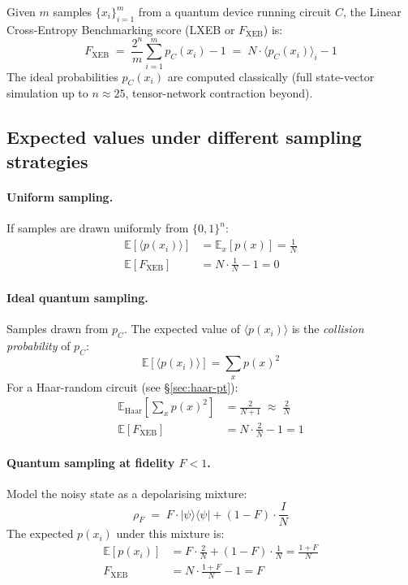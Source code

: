 \documentclass[11pt,a4paper]{article}
\theoremstyle{plain}
\theoremstyle{definition}
\theoremstyle{remark}
\newcommand{\E}{\mathbb{E}}
\begin{document}
Given $m$ samples $\{x_i\}_{i=1}^{m}$ from a quantum device running circuit $C$, the Linear Cross-Entropy Benchmarking score (LXEB or $F_{\mathrm{XEB}}$) is:
\begin{equation}
F_{\mathrm{XEB}} \;=\; \frac{2^n}{m} \sum_{i=1}^{m} p_C(x_i) - 1 \;=\; N \cdot \langle p_C(x_i) \rangle_i - 1
\label{eq:fxeb-def}
\end{equation}
The ideal probabilities $p_C(x_i)$ are computed classically (full state-vector simulation up to $n \approx 25$, tensor-network contraction beyond).

\subsection{Expected values under different sampling strategies}

\paragraph{Uniform sampling.} If samples are drawn uniformly from $\{0,1\}^n$:
\begin{align}
\E[\langle p(x_i) \rangle] &= \E_x[p(x)] = \frac{1}{N} \\
\E[F_{\mathrm{XEB}}] &= N \cdot \frac{1}{N} - 1 = 0
\end{align}

\paragraph{Ideal quantum sampling.} Samples drawn from $p_C$. The expected value of $\langle p(x_i)\rangle$ is the \emph{collision probability} of $p_C$:
\begin{equation}
\E[\langle p(x_i) \rangle] = \sum_x p(x)^2
\end{equation}
For a Haar-random circuit (see §\ref{sec:haar-pt}):
\begin{align}
\E_{\mathrm{Haar}}\!\left[\sum_x p(x)^2\right] &= \frac{2}{N+1} \;\approx\; \frac{2}{N} \\
\E[F_{\mathrm{XEB}}] &= N \cdot \frac{2}{N} - 1 = 1
\end{align}

\paragraph{Quantum sampling at fidelity $F < 1$.} Model the noisy state as a depolarising mixture:
\begin{equation}
\rho_F \;=\; F \cdot |\psi\rangle\langle\psi| + (1-F) \cdot \frac{I}{N}
\end{equation}
The expected $p(x_i)$ under this mixture is:
\begin{align}
\E[p(x_i)] &= F \cdot \frac{2}{N} + (1-F) \cdot \frac{1}{N} = \frac{1+F}{N} \\
F_{\mathrm{XEB}} &= N \cdot \frac{1+F}{N} - 1 = F
\end{align}
\end{document}
